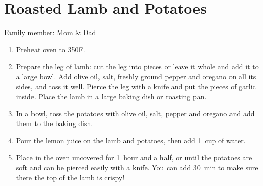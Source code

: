 \chapter{Roasted Lamb and Potatoes}
\label{ch:lambpotatoes}


Family member: Mom \& Dad

\begin{enumerate}
    \item Preheat oven to 350\degree F.
    \item Prepare the leg of lamb: cut the leg into pieces or leave it whole and add it to a large bowl.  Add olive oil, salt, freshly ground pepper and oregano on all its sides, and toss it well. Pierce the leg with a knife and put the pieces of garlic inside. Place the lamb in a large baking dish or roasting pan.
    \item In a bowl, toss the potatoes with olive oil, salt, pepper and oregano and add them to the baking dish.
    \item Pour the lemon juice on the lamb and potatoes, then add 1~cup of water.
    \item Place in the oven uncovered for 1~hour and a half, or until the potatoes are soft and can be pierced easily with a knife. You can add 30~min to make sure there the top of the lamb is crispy!
\end{enumerate}


